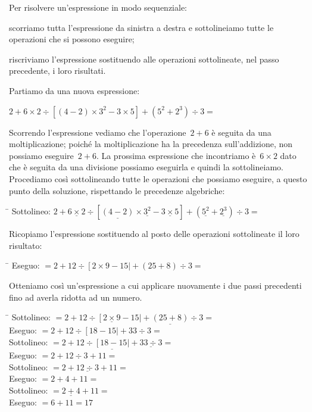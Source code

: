 \begin{procedura}
 Per risolvere un'espressione in modo sequenziale:
\begin{enumerate*} 
 \item scorriamo tutta l'espressione da sinistra a destra 
 e sottolineiamo tutte le operazioni che si possono eseguire;
 \item riscriviamo l'espressione sostituendo alle operazioni sottolineate,
 nel passo precedente, i loro risultati.
\end{enumerate*}
\end{procedura}

Partiamo da una nuova espressione:

\(2 + 6 \times 2 \div 
 \left[ \left(4 -2 \right) \times 3^{2} - 3 \times 5 \right] +
 \left( 5^{2} + 2^{3} \right) \div 3 =\)
 
Scorrendo l'espressione vediamo che l'operazione~\(2 + 6\) è seguita da una 
moltiplicazione; poiché la moltiplicazione ha la precedenza sull'addizione,
non possiamo eseguire~\(2 + 6\). La prossima espressione che incontriamo 
è~\(6 \times 2\) dato che è seguita da una divisione possiamo eseguirla e 
quindi la sottolineiamo. Procediamo così sottolineando tutte le operazioni
che possiamo eseguire, a questo punto della soluzione, rispettando le
precedenze algebriche:
\begin{tabbing}
\hspace{3cm}\=\kill
 Sottolineo: \> \(2 + 
 \underline{6 \times 2} \div \left[ \underline{\left(4 -2 \right)} 
   \times \underline{3^{2}} - 
   \underline{3 \times 5} \right] +
 \left( \underline{5^{2}} + \underline{2^{3}} \right) \div 3 =\)
\end{tabbing} 

Ricopiamo l'espressione sostituendo al posto delle operazioni 
sottolineate il loro risultato:
\begin{tabbing}
\hspace{3cm}\=\kill
 Eseguo: \> \(= 2 + 
 12 \div \left[ 2 \times 9 - 15 \right| +
 \left( 25 + 8 \right) \div 3 =\)
\end{tabbing} 

Otteniamo così un'espressione a cui applicare nuovamente i due passi 
precedenti fino ad averla ridotta ad un numero.

\begin{tabbing}
\hspace{3cm}\=\kill
 Sottolineo: \> \(= 2 + 
 12 \div \left[ \underline{2 \times 9} - 15 \right| +
 \underline{\left( 25 + 8 \right)} \div 3 =\) \\ 
 Eseguo: \> \(= 2 + 12 \div \left[ 18 - 15 \right| +
 33 \div 3 =\) \\ 
 Sottolineo: \> \(= 2 + 
 12 \div \underline{\left[ 18 - 15 \right|} +
 \underline{33 \div 3} =\) \\ 
 Eseguo: \> \(= 2 + 
 12 \div 3 +
 11 =\) \\ 
 Sottolineo: \> \(= 2 + 
 \underline{12 \div 3} +
 11 =\) \\ 
 Eseguo: \> \(= 2 + 
 4 +
 11 =\) \\ 
 Sottolineo: \> \(= \underline{2 +  4} + 11 =\) \\ 
 Eseguo: \> \(= 6 + 11 = 17\)
\end{tabbing} 

